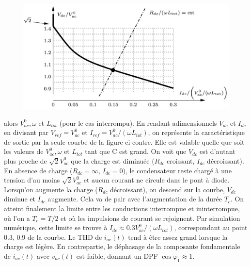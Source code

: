 			\begin{figure}
			\vspace{-5mm}
			\includegraphics[scale=0.3]{ch2/16}
			\end{figure} 
			alors $V_{ac}^0, \omega$ et $L_{tot}$ (pour le cas interrompu). En rendant adimensionnels $V_{dc}$ et $I_{dc}$ en divisant par $V_{ref} = V_{ac}^0$ et $I_{ref} = V_{ac}^0/(\omega L_{tot})$, on représente la caractéristique de sortie par la seule courbe de la figure ci-contre. Elle est valable quelle que soit les valeurs de $V_{ac}^0, \omega$ et $L_{tot}$ tant que C est grand. On voit que $V_{dc}$ est d'autant plus proche 
			\newpage 
			de $\sqrt{2}V_{ac}^0$ que la charge est diminuée ($R_{dc}$ croissant, $I_{dc}$ décroissant). En absence de charge ($R_{dc} = \infty$, $I_{dc} = 0$), le condensateur reste chargé à une tension d'au moins $\sqrt{2}V_{ac}^0$ et aucun courant ne circule dans le pont à diode. \\
			Lorsqu'on augmente la charge ($R_{dc}$ décroissant), on descend sur la courbe, $V_{dc}$ diminue et $I_{dc}$ augmente. Cela va de pair avec l'augmentation de la durée $T_c$. On atteint finalement la limite entre les conductions interrompue et ininterrompue, où l'on a $T_c = T/2$ et où les impulsions de courant se rejoignent. Par simulation numérique, cette limite se trouve à $I_{dc} \approx 0.3 V_{ac}^0/(\omega L_{tot})$, correspondant au point {0.3, 0.9} de la courbe. Le THD de $i_{ac}(t)$ tend à être assez grand lorsque la charge est légère. En contrepartie, le déphasage de la composante fondamentale de $i_{ac}(t)$ avec $v_{ac}(t)$ est faible, donnant un DPF $\cos \varphi _1 \approx 1$. 
			
